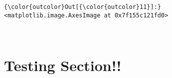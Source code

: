 \documentclass[11pt]{article}
\begin{document}
\begin{Verbatim}[commandchars=\\\{\}]
{\color{outcolor}Out[{\color{outcolor}11}]:} <matplotlib.image.AxesImage at 0x7f155c121fd0>
\end{Verbatim}
            
    \begin{center}
    \end{center}
    { \hspace*{\fill} \\}
    
    \section{Testing Section!!}\label{testing-section}
\end{document}
